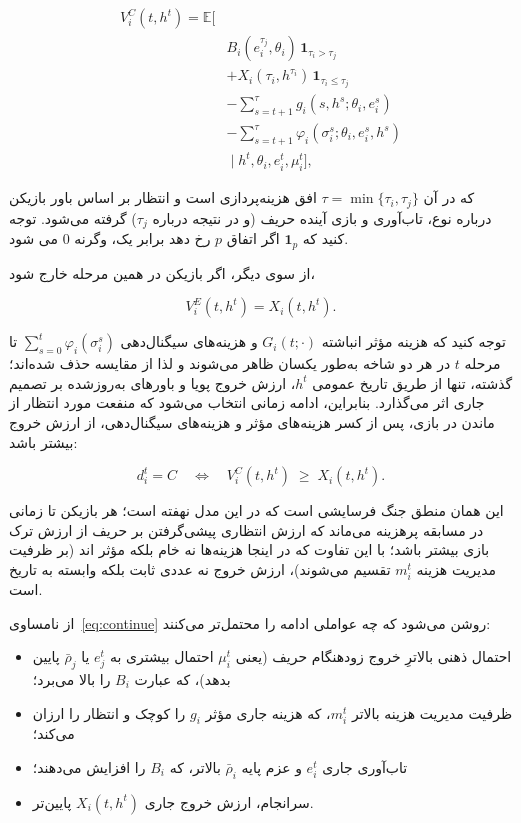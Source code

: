 \documentclass[12pt]{article}
\begin{document}
\begin{align*}
    V_i^C(t,h^t) = 
    \mathbb{E}\Big[ \\
        & B_i(e_i^{\tau_j},\theta_i)\,\mathbf{1}_{\tau_i > \tau_j} \\
        & + X_i(\tau_i,h^{\tau_i})\,\mathbf{1}_{\tau_i \le \tau_j} \\
        & - \sum_{s=t+1}^{\tau} g_i(s,h^s;\theta_i,e_i^s)  \\
        & - \sum_{s=t+1}^{\tau} \varphi_i(\sigma_i^s;\theta_i,e_i^s,h^s) \\
    & \;\Big|\; h^t,\theta_i,e_i^t,\mu_i^t \Big],
\end{align*}

که در آن $\tau = \min\{\tau_i,\tau_j\}$ افق هزینه‌پردازی است و انتظار بر 
اساس باور بازیکن
درباره نوع، تاب‌آوری و بازی آینده حریف 
(و در نتیجه درباره $\tau_j$)
 گرفته می‌شود.
 توجه کنید که 
 $\mathbf{1}_p$
 اگر اتفاق 
 $p$
 رخ دهد برابر یک، وگرنه $0$
 می شود.

از سوی دیگر، اگر بازیکن در همین مرحله خارج شود،

\begin{equation*}
    V_i^E(t,h^t) = X_i(t,h^t).
\end{equation*}

توجه کنید که هزینه مؤثر انباشته 
$G_i(t;\cdot)$
 و هزینه‌های سیگنال‌دهی
$\sum_{s=0}^{t}\varphi_i(\sigma_i^s)$
 تا مرحله $t$
در هر دو شاخه به‌طور یکسان ظاهر می‌شوند و لذا از مقایسه حذف شده‌اند؛
گذشته، تنها از طریق تاریخ عمومی $h^t$،
 ارزش خروج پویا و باورهای به‌روزشده بر تصمیم جاری اثر می‌گذارد.
بنابراین، ادامه زمانی انتخاب می‌شود که منفعت مورد انتظار از ماندن در بازی، پس از کسر
هزینه‌های مؤثر و هزینه‌های سیگنال‌دهی، از ارزش خروج بیشتر باشد:

\begin{equation}
    \label{eq:continue}
    d_i^t = C \quad\Longleftrightarrow\quad
    V_i^C(t,h^t) \;\ge\; X_i(t,h^t).
\end{equation}

این همان منطق جنگ فرسایشی است که در این مدل نهفته است؛
 هر بازیکن تا زمانی در مسابقه پرهزینه
می‌ماند که ارزش انتظاری پیشی‌گرفتن بر حریف از ارزش ترک بازی 
بیشتر باشد؛ با این تفاوت که در اینجا
هزینه‌ها نه خام بلکه 
مؤثر
 اند (بر ظرفیت مدیریت هزینه $m_i^t$ تقسیم می‌شوند)،
ارزش خروج نه عددی ثابت بلکه 
  وابسته به تاریخ
 است.

از نامساوی~\eqref{eq:continue} روشن می‌شود که چه عواملی ادامه را محتمل‌تر می‌کنند:

\begin{itemize}
    \item احتمال ذهنی بالاترِ خروج زودهنگام حریف 
    (یعنی $\mu_i^t$ احتمال بیشتری به $e_j^t$ یا $\bar{\rho}_j$ پایین بدهد)، 
    که عبارت $B_i$ را بالا می‌برد؛
    \item ظرفیت مدیریت هزینه بالاتر 
    $m_i^t$، 
    که هزینه جاری مؤثر $g_i$
     را کوچک و انتظار را ارزان می‌کند؛
    \item تاب‌آوری جاری $e_i^t$
     و عزم پایه 
     $\bar{\rho}_i$
      بالاتر، که 
      $B_i$ 
      را افزایش می‌دهند؛
    \item  سرانجام، ارزش خروج جاری $X_i(t,h^t)$ پایین‌تر.
\end{itemize}
\end{document}
